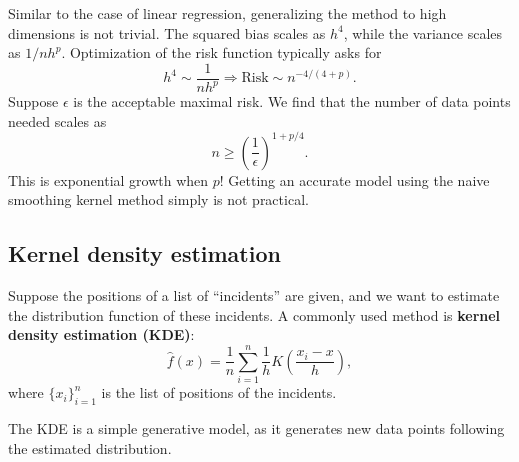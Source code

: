 \documentclass[hyperref, a4paper]{article}
\newcommand*{\concept}[1]{{\textbf{#1}}}
\begin{document}
Similar to the case of linear regression,
generalizing the method to high dimensions is not trivial.
The squared bias scales as $h^4$, while the variance scales as $1 / nh^p$.
Optimization of the risk function typically asks for 
\begin{equation}
    h^4 \sim \frac{1}{n h^p} \Rightarrow \text{Risk} \sim n^{-4/(4+p)}.
\end{equation}
Suppose $\epsilon$ is the acceptable maximal risk. We find that the number of data points needed scales as 
\begin{equation}
    n \geq \left(\frac{1}{\epsilon}\right)^{1 + p/4}.
\end{equation}
This is exponential growth when $p$! Getting an accurate model using the naive smoothing kernel method simply is not practical.

\subsection{Kernel density estimation}

Suppose the positions of a list of ``incidents'' are given,
and we want to estimate the distribution function of these incidents.
A commonly used method is \concept{kernel density estimation (KDE)}:
\begin{equation}
    \hat{f}(x) = \frac{1}{n} \sum_{i=1}^{n} \frac{1}{h} K \left( \frac{x_i - x}{h} \right),
\end{equation}
where $\{x_i\}_{i=1}^n$ is the list of positions of the incidents.

The KDE is a simple generative model, as it generates new data points following the estimated distribution.
\end{document}

